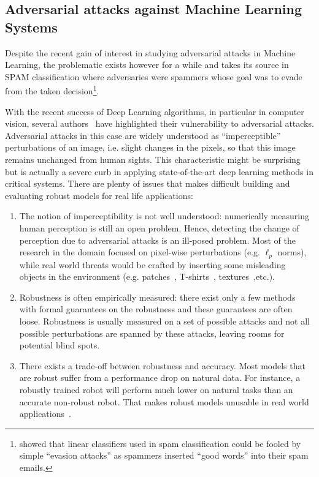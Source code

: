 \subsection{Adversarial attacks against Machine Learning Systems}

Despite the recent gain of interest in studying adversarial attacks in Machine Learning, the problematic exists however for a while and takes its source in SPAM classification where adversaries were spammers whose goal was to evade from the taken decision\footnote{\cite{dalvi2004adversarial} showed that linear classifiers used in spam classification could be fooled by simple ``evasion attacks'' as spammers inserted ``good words'' into their spam emails.}.

With the recent success of Deep Learning algorithms, in particular in computer vision, several authors~\citep{biggio2013evasion,Szegedy2013IntriguingPO} have  highlighted their vulnerability to adversarial attacks. Adversarial attacks in this case are widely understood as ``imperceptible'' perturbations of an image, i.e. slight changes in the pixels, so that this image remains unchanged from human sights. This characteristic might be surprising but is actually a severe curb in applying state-of-the-art deep learning methods in critical systems. There are plenty of issues that makes difficult building and evaluating robust models for real life applications:
\begin{enumerate}
    \item The notion of imperceptibility is not well understood: numerically measuring human perception is still an open problem. Hence, detecting the change of perception due to adversarial attacks is an ill-posed problem. Most of the  research in the domain focused on pixel-wise perturbations (e.g. $\ell_p$ norms), while real world threats would be crafted by inserting some misleading objects in the environment (e.g. patches~\citep{brown2017adversarial}, T-shirts~\citep{xu2020adversarial}, textures~\citep{wiyatno2019physical},etc.).
    \item Robustness is often empirically measured: there exist only a few methods with formal guarantees on the robustness and these guarantees are often loose. Robustness is usually measured on a set of possible attacks and not all possible perturbations are spanned by these attacks, leaving rooms for potential blind spots.
    \item There exists a trade-off between robustness and accuracy. Most models that are robust suffer from a performance drop on natural data. For instance, a robustly trained robot will perform much lower on natural tasks than an accurate non-robust robot. That makes robust models unusable in real world applications~\citep{lechner2021adversarial}. 
\end{enumerate}

